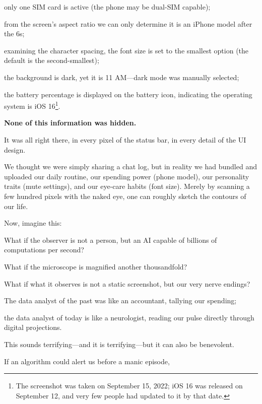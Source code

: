 only one SIM card is active (the phone may be dual-SIM capable);

from the screen's aspect ratio we can only determine it is an iPhone model after the 6s;

examining the character spacing, the font size is set to the smallest option (the default is the second-smallest);

the background is dark, yet it is 11 AM---dark mode was manually selected;

the battery percentage is displayed on the battery icon, indicating the operating system is iOS 16\footnote{The screenshot was taken on September 15, 2022; iOS 16 was released on September 12, and very few people had updated to it by that date.}.

\vspace{1em}

\textbf{None of this information was hidden.}

It was all right there, in every pixel of the status bar, in every detail of the UI design.

We thought we were simply sharing a chat log, but in reality we had bundled and uploaded our daily routine, our spending power (phone model), our personality traits (mute settings), and our eye-care habits (font size).
Merely by scanning a few hundred pixels with the naked eye, one can roughly sketch the contours of our life.

\vspace{1em}

Now, imagine this:

What if the observer is not a person, but an AI capable of billions of computations per second?

What if the microscope is magnified another thousandfold?

What if what it observes is not a static screenshot, but our very nerve endings?

\vspace{1em}

The data analyst of the past was like an accountant, tallying our spending;

the data analyst of today is like a neurologist, reading our pulse directly through digital projections.

\vspace{1em}

This sounds terrifying---and it is terrifying---but it can also be benevolent.

If an algorithm could alert us before a manic episode,

